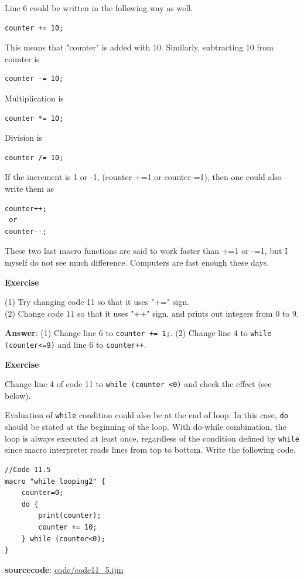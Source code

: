 \documentclass[11pt,a4paper,oneside]{report}
\newenvironment{indentexercise}[1]
{{\setlength{\leftmargin}{2em}}
\textbf{Exercise \thesubsection-#1}
\begin{list}{}
	\item
}
{\end{list}}
\newcommand{\ilcom}[1]{\texttt{\small#1}}
\begin{document}
Line 6 could be written in the following way as well.
\begin{lstlisting}[numbers=none]
counter += 10;
\end{lstlisting}
This means that "counter" is added with 10. Similarly, subtracting 10 from counter is 
\begin{lstlisting}[numbers=none]
counter -= 10;
\end{lstlisting}
Multiplication is 
\begin{lstlisting}[numbers=none]
counter *= 10;
\end{lstlisting}
Division is
\begin{lstlisting}[numbers=none]
counter /= 10;
\end{lstlisting}
If the increment is 1 or -1, (counter +=1 or counter-=1), then one could also write them  as 
\begin{lstlisting}[numbers=none]
counter++;
 or 
counter--;
\end{lstlisting}
These two last macro functions are said to work faster than +=1 or -=1, but I myself do not see much difference. Computers are fast enough these days. 

\begin{indentexercise}{1}
(1) Try changing code 11 so that it uses "+=" sign.\\
(2) Change code 11 so that it uses "++" sign, and prints out integers from 0 to 9.\\

\item \textbf{Answer}: (1) Change line 6 to \ilcom{counter += 1;}. (2) Change line 4 to \ilcom{while (counter<=9)} and line 6 to \ilcom{counter++}.
\end{indentexercise}

\begin{indentexercise}{2}
Change line 4 of code 11 to \ilcom{while (counter <0)} and check the effect (see below).
\end{indentexercise}

Evaluation of \ilcom{while} condition could also be at the end of loop. In this case, \ilcom{do} should be stated at the beginning of the loop. With do-while combination, the loop is always executed at least once, regardless of the condition defined by \ilcom{while} since macro interpreter reads lines from top to bottom. Write the following code.


\begin{lstlisting}[morekeywords={*, while}]
//Code 11.5
macro "while looping2" {
	counter=0;
	do {
		print(counter);
		counter += 10;
	} while (counter<0); 
}
\end{lstlisting}
\textbf{sourcecode}: \href{http://www.example.com/contents}{code/code11\_5.ijm}
\end{document}
